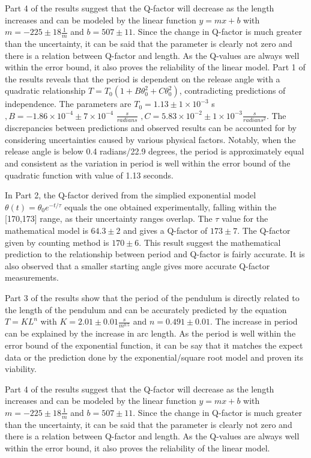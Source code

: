 \documentclass{article}
\begin{document}
Part 4 of the results suggest that the Q-factor will decrease as the length increases and can be modeled by the linear function $y = mx + b$ with $m = -225 \pm 18\frac{1}{m}$ and $b = 507 \pm 11$. Since the change in Q-factor is much greater than the uncertainty, it can be said that the parameter is clearly not zero and there is a relation between Q-factor and length. As the Q-values are always well within the error bound, it also proves the reliability of the linear model.
Part 1 of the results reveals that the period is dependent on the release angle with a quadratic relationship $T = T_0(1 + B\theta_0^2 + C\theta_0^2)$, contradicting predictions of independence. The parameters are $T_0 = 1.13  \pm 1\times10^{-3} $ s $, B = -1.86\times10^{-4}  \pm 7\times10^{-4}$ $\frac{s}{radians}$ $, C = 5.83\times10^{-2} \pm 1\times10^{-3} \frac{s}{radians^2}$. The discrepancies between predictions and observed results can be accounted for by considering uncertainties caused by various physical factors. Notably, when the release angle is below 0.4 radians/22.9 degrees, the period is approximately equal and consistent as the variation in period is well within the error bound of the quadratic function with value of 1.13 seconds.

In Part 2, the Q-factor derived from the simplied exponential model $\theta(t) = \theta_0 e^{-t/\tau}$ equals the one obtained experimentally, falling within the [170,173] range, as their uncertainty ranges overlap. The $\tau$ value for the mathematical model  is $64.3 \pm 2$ and gives a Q-factor of $173 \pm 7$. The Q-factor given by counting method is $170 \pm 6$. This result suggest the mathematical prediction to the relationship between period and Q-factor is fairly accurate. It is also observed that a smaller starting angle gives more accurate Q-factor measurements.

Part 3 of the results show that the period of the pendulum is directly related to the length of the pendulum and can be accurately predicted by the equation $T = KL^n$ with $K = 2.01 \pm 0.01\frac{s}{m^{0.5}}$ and $n = 0.491 \pm 0.01$. The increase in period can be explained by the increase in arc length. As the period is well within the error bound of the exponential function, it can be say that it matches the expect data or the prediction done by the exponential/square root model and proven its viability. 

Part 4 of the results suggest that the Q-factor will decrease as the length increases and can be modeled by the linear function $y = mx + b$ with $m = -225 \pm 18\frac{1}{m}$ and $b = 507 \pm 11$. Since the change in Q-factor is much greater than the uncertainty, it can be said that the parameter is clearly not zero and there is a relation between Q-factor and length. As the Q-values are always well within the error bound, it also proves the reliability of the linear model.
\end{document}

